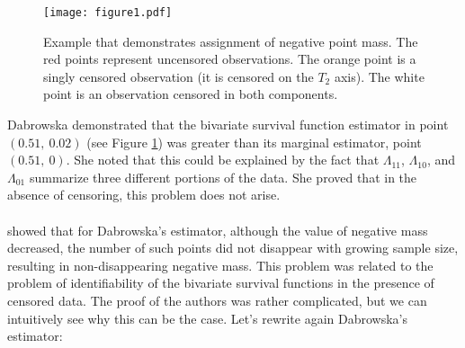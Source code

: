\documentclass[]{article}
\begin{document}
\begin{figure}[!h]
\texttt{[image: figure1.pdf]}
\caption{Example that demonstrates assignment of negative point mass. The red points represent uncensored observations. The orange point is a singly censored observation (it is censored on the $T_2$ axis). The white point is an observation censored in both components.}
\label{fig:bubbles}
\end{figure}

Dabrowska demonstrated that the bivariate survival function estimator in point $(0.51,~0.02)$ (see Figure \ref{fig:bubbles}) was greater than its marginal estimator, point $(0.51,~0)$. She noted that this could be explained by the fact that $\Lambda_{11}$, $\Lambda_{10}$, and $\Lambda_{01}$ summarize three different portions of the data. She proved that in the absence of censoring, this problem does not arise.\\
~\\
\cite{pruitt1991negative} showed that for Dabrowska's estimator, although the value of negative mass decreased, the number of such points did not disappear with growing sample size, resulting in non-disappearing negative mass. This problem was related to the problem of identifiability of the bivariate survival functions in the presence of censored data. The proof of the authors was rather complicated, but we can intuitively see why this can be the case. Let's rewrite again Dabrowska's estimator:
\end{document}
